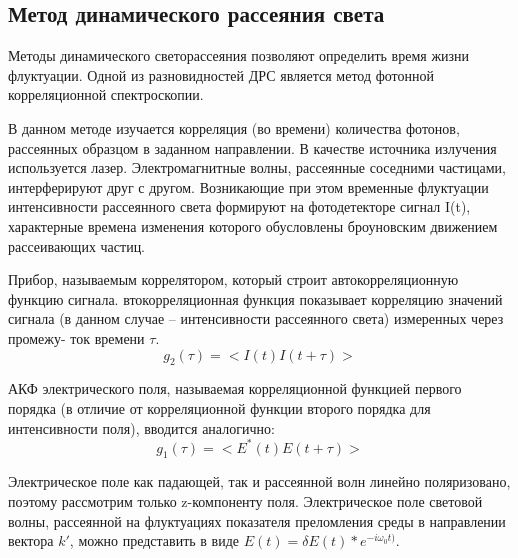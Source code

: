 \documentclass[a4paper,10pt]{article}
\begin{document}
\subsection{Метод динамического рассеяния света}
Методы динамического светорассеяния
позволяют определить время жизни флуктуации. Одной из разновидностей ДРС является метод фотонной корреляционной спектроскопии.

В данном методе изучается корреляция (во времени) количества фотонов,
рассеянных образцом в заданном направлении. В качестве источника излучения
используется лазер. Электромагнитные волны, рассеянные соседними частицами, интерферируют друг с другом. Возникающие при этом временные флуктуации интенсивности рассеянного света формируют на фотодетекторе сигнал I(t), характерные времена изменения которого обусловлены броуновским движением рассеивающих частиц. 


Прибор, называемым коррелятором, который строит автокорреляционную функцию сигнала. втокорреляционная функция показывает корреляцию значений сигнала (в
данном случае – интенсивности рассеянного света) измеренных через промежу-
ток времени $\tau$.
\begin{equation}
    g_2(\tau) = <I(t)I(t+\tau)>
\end{equation}

АКФ электрического поля, называемая корреляционной функцией первого
порядка (в отличие от корреляционной функции второго порядка для
интенсивности поля), вводится аналогично:
\begin{equation}
    g_1(\tau) = <E^*(t)E(t+\tau)>
\end{equation}

Электрическое поле как падающей, так и рассеянной волн линейно поляризовано, поэтому рассмотрим только z-компоненту поля. Электрическое поле световой волны, рассеянной на флуктуациях показателя преломления среды в направлении вектора $k'$, можно представить в виде $E(t) = \delta E(t)*e^{-i\omega_0 t)}$.
\end{document}
